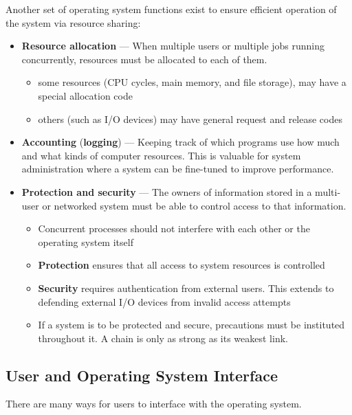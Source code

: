 \documentclass{article}
\begin{document}
Another set of operating system functions exist to ensure efficient
operation of the system via resource sharing:
\begin{itemize}
    \item \textbf{Resource allocation} --- When multiple users or
          multiple jobs running concurrently, resources must be
          allocated to each of them.
          \begin{itemize}
              \item some resources (CPU cycles, main memory, and file
                    storage), may have a special allocation code
              \item others (such as I/O devices) may have general
                    request and release codes
          \end{itemize}
    \item \textbf{Accounting} (\textbf{logging}) --- Keeping track of
          which programs use how much and what kinds of computer
          resources. This is valuable for system administration where a
          system can be fine-tuned to improve performance.
    \item \textbf{Protection and security} --- The owners of information
          stored in a multi-user or networked system must be able to
          control access to that information.
          \begin{itemize}
              \item Concurrent processes should not interfere with each
                    other or the operating system itself
              \item \textbf{Protection} ensures that all access to
                    system resources is controlled
              \item \textbf{Security} requires authentication from
                    external users. This extends to defending external
                    I/O devices from invalid access attempts
              \item If a system is to be protected and secure,
                    precautions must be instituted throughout it. A
                    chain is only as strong as its weakest link.
          \end{itemize}
\end{itemize}
\subsection{User and Operating System Interface}
There are many ways for users to interface with the operating system.
\end{document}
